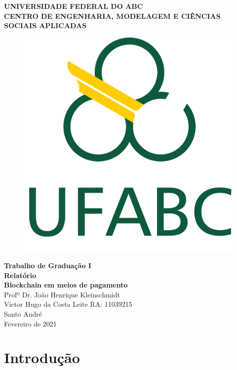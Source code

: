 \documentclass[12pt]{article}
\begin{document}
\begin{center}
    

{\bf UNIVERSIDADE FEDERAL DO ABC\\
CENTRO DE ENGENHARIA, MODELAGEM E CIÊNCIAS SOCIAIS APLICADAS }\\[0.7cm]

\begin{figure}[H]
    \centering
    \includegraphics[scale=0.4]{Imagens/Ufabc_logo.png}
    \label{fig:ufabc_logo}
\end{figure}

{\large
    {\bf Trabalho de Graduação I}\\[0.7cm]
    {\bf Relatório}\\[0.7cm]
    {\bf Blockchain em meios de pagamento}
}\\[1.5cm]

Profº Dr. João Henrique Kleinschmidt\\[0.3cm]
Victor Hugo da Costa Leite                RA: 11039215\\[5.0cm]

Santo André\\Fevereiro de 2021
   
\end{center}
\newpage
\section{Introdução}
\end{document}
